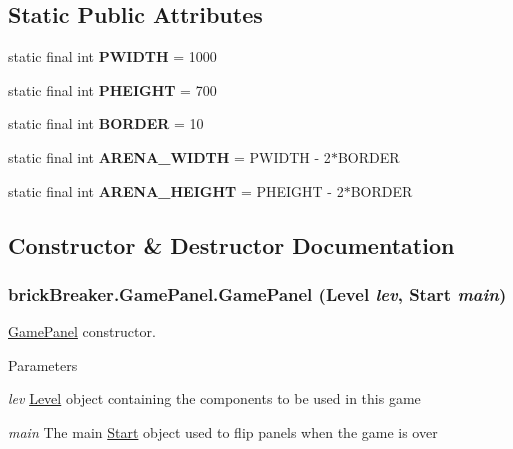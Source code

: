 \subsection*{Static Public Attributes}
\begin{DoxyCompactItemize}
\item 
\hypertarget{classbrick_breaker_1_1_game_panel_ade79ff9ff8f4de5cfa2f02fe8701e12d}{
static final int {\bfseries PWIDTH} = 1000}
\label{classbrick_breaker_1_1_game_panel_ade79ff9ff8f4de5cfa2f02fe8701e12d}

\item 
\hypertarget{classbrick_breaker_1_1_game_panel_a91b8f40423595d7b8736d6c0e8e3ce2e}{
static final int {\bfseries PHEIGHT} = 700}
\label{classbrick_breaker_1_1_game_panel_a91b8f40423595d7b8736d6c0e8e3ce2e}

\item 
\hypertarget{classbrick_breaker_1_1_game_panel_ac4460432a58e6284b97eaa6a08e69858}{
static final int {\bfseries BORDER} = 10}
\label{classbrick_breaker_1_1_game_panel_ac4460432a58e6284b97eaa6a08e69858}

\item 
\hypertarget{classbrick_breaker_1_1_game_panel_a59de5a835b862d59d91cf561eae7e87f}{
static final int {\bfseries ARENA\_\-WIDTH} = PWIDTH -\/ 2$\ast$BORDER}
\label{classbrick_breaker_1_1_game_panel_a59de5a835b862d59d91cf561eae7e87f}

\item 
\hypertarget{classbrick_breaker_1_1_game_panel_af1a2ab5d5cf158f0231a00ba886a8a10}{
static final int {\bfseries ARENA\_\-HEIGHT} = PHEIGHT -\/ 2$\ast$BORDER}
\label{classbrick_breaker_1_1_game_panel_af1a2ab5d5cf158f0231a00ba886a8a10}

\end{DoxyCompactItemize}


\subsection{Constructor \& Destructor Documentation}
\hypertarget{classbrick_breaker_1_1_game_panel_a9babd944824d2c3462b8dbdc099d65b4}{
\subsubsection[{GamePanel}]{\setlength{\rightskip}{0pt plus 5cm}brickBreaker.GamePanel.GamePanel ({\bf Level} {\em lev}, \/  {\bf Start} {\em main})}}
\label{classbrick_breaker_1_1_game_panel_a9babd944824d2c3462b8dbdc099d65b4}
\hyperlink{classbrick_breaker_1_1_game_panel}{GamePanel} constructor. 
\begin{DoxyParams}{Parameters}
\item[{\em lev}]\hyperlink{classbrick_breaker_1_1_level}{Level} object containing the components to be used in this game \item[{\em main}]The main \hyperlink{classbrick_breaker_1_1_start}{Start} object used to flip panels when the game is over \end{DoxyParams}


